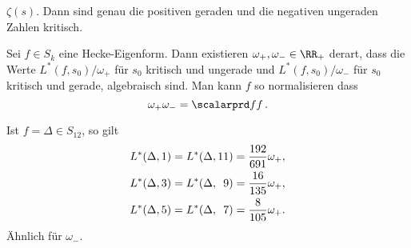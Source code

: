 \begin{bsp}
	$\zeta(s)$. Dann sind genau die positiven geraden und die negativen ungeraden Zahlen kritisch.
\end{bsp}

\begin{satz}
	Sei $f \in S_k$ eine Hecke-Eigenform.
	Dann existieren $\omega_+, \omega_- \in \RR_+$ derart, dass die Werte $L^*(f, s_0)/\omega_+$ für $s_0$ kritisch und ungerade und $L^*(f, s_0)/\omega_-$ für $s_0$ kritisch und gerade, algebraisch sind. Man kann $f$ so normalisieren dass
	\[
		\omega_+ \omega_- = \scalarprd ff\,.
	\]
\end{satz}

\begin{bsp}
	Ist $f = \Delta \in S_{12}$, so gilt
	\begin{align*}
		L^*(\Delta, 1) &= L^*(\Delta, 11) = \frac{192}{691} \omega_+, \\
		L^*(\Delta, 3) &= L^*(\Delta, \phantom{11}\makebox[0pt][r]{9}) = \frac{16}{135} \omega_+, \\
		L^*(\Delta, 5) &= L^*(\Delta, \phantom{11}\makebox[0pt][r]{7}) = \frac{8}{105} \omega_+.
	\end{align*}
	Ähnlich für $\omega_-$.
\end{bsp}